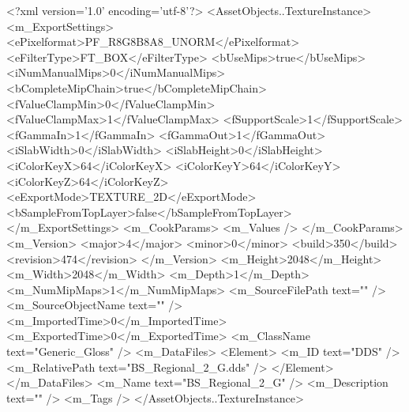 <?xml version='1.0' encoding='utf-8'?>
<AssetObjects..TextureInstance>
  <m_ExportSettings>
    <ePixelformat>PF_R8G8B8A8_UNORM</ePixelformat>
    <eFilterType>FT_BOX</eFilterType>
    <bUseMips>true</bUseMips>
    <iNumManualMips>0</iNumManualMips>
    <bCompleteMipChain>true</bCompleteMipChain>
    <fValueClampMin>0</fValueClampMin>
    <fValueClampMax>1</fValueClampMax>
    <fSupportScale>1</fSupportScale>
    <fGammaIn>1</fGammaIn>
    <fGammaOut>1</fGammaOut>
    <iSlabWidth>0</iSlabWidth>
    <iSlabHeight>0</iSlabHeight>
    <iColorKeyX>64</iColorKeyX>
    <iColorKeyY>64</iColorKeyY>
    <iColorKeyZ>64</iColorKeyZ>
    <eExportMode>TEXTURE_2D</eExportMode>
    <bSampleFromTopLayer>false</bSampleFromTopLayer>
  </m_ExportSettings>
  <m_CookParams>
    <m_Values />
  </m_CookParams>
  <m_Version>
    <major>4</major>
    <minor>0</minor>
    <build>350</build>
    <revision>474</revision>
  </m_Version>
  <m_Height>2048</m_Height>
  <m_Width>2048</m_Width>
  <m_Depth>1</m_Depth>
  <m_NumMipMaps>1</m_NumMipMaps>
  <m_SourceFilePath text="" />
  <m_SourceObjectName text="" />
  <m_ImportedTime>0</m_ImportedTime>
  <m_ExportedTime>0</m_ExportedTime>
  <m_ClassName text="Generic_Gloss" />
  <m_DataFiles>
    <Element>
      <m_ID text="DDS" />
      <m_RelativePath text="BS_Regional_2_G.dds" />
    </Element>
  </m_DataFiles>
  <m_Name text="BS_Regional_2_G" />
  <m_Description text="" />
  <m_Tags />
</AssetObjects..TextureInstance>